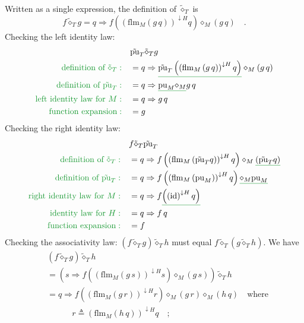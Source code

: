 Written as a single expression, the definition of $\tilde{\diamond}_{T}$
is
\begin{equation}
f\tilde{\diamond}_{T}g=q\Rightarrow f\left(\left(\text{flm}_{M}\left(g\,q\right)\right)^{\downarrow H}q\right)\diamond_{M}\left(g\,q\right)\quad.\label{eq:def-flipped-kleisli}
\end{equation}
Checking the left identity law:
\begin{align*}
 & \tilde{\text{pu}}_{T}\tilde{\diamond}_{T}g\\
{\color{greenunder}\text{definition of }\tilde{\diamond}_{T}:}\quad & =q\Rightarrow\gunderline{\tilde{\text{pu}}_{T}\left(\left(\text{flm}_{M}\left(g\,q\right)\right)^{\downarrow H}q\right)}\diamond_{M}\left(g\,q\right)\\
{\color{greenunder}\text{definition of }\tilde{\text{pu}}_{T}:}\quad & =q\Rightarrow\gunderline{\text{pu}_{M}\diamond_{M}}g\,q\\
{\color{greenunder}\text{left identity law for }M:}\quad & =q\Rightarrow g\,q\\
{\color{greenunder}\text{function expansion}:}\quad & =g
\end{align*}
Checking the right identity law:
\begin{align*}
 & f\tilde{\diamond}_{T}\tilde{\text{pu}}_{T}\\
{\color{greenunder}\text{definition of }\tilde{\diamond}_{T}:}\quad & =q\Rightarrow f\left(\left(\text{flm}_{M}\left(\tilde{\text{pu}}_{T}q\right)\right)^{\downarrow H}q\right)\diamond_{M}\gunderline{\left(\tilde{\text{pu}}_{T}q\right)}\\
{\color{greenunder}\text{definition of }\tilde{\text{pu}}_{T}:}\quad & =q\Rightarrow f\left(\left(\text{flm}_{M}\left(\text{pu}_{M}\right)\right)^{\downarrow H}q\right)\gunderline{\diamond_{M}\text{pu}_{M}}\\
{\color{greenunder}\text{right identity law for }M:}\quad & =q\Rightarrow f\gunderline{\left(\left(\text{id}\right)^{\downarrow H}q\right)}\\
{\color{greenunder}\text{identity law for }H:}\quad & =q\Rightarrow f\,q\\
{\color{greenunder}\text{function expansion}:}\quad & =f
\end{align*}
Checking the associativity law: $\left(f\tilde{\diamond}_{T}g\right)\tilde{\diamond}_{T}h$
must equal $f\tilde{\diamond}_{T}\left(g\tilde{\diamond}_{T}h\right)$.
We have
\begin{align*}
 & \left(f\tilde{\diamond}_{T}g\right)\tilde{\diamond}_{T}h\\
 & =\left(s\Rightarrow f\left(\left(\text{flm}_{M}\left(g\,s\right)\right)^{\downarrow H}s\right)\diamond_{M}\left(g\,s\right)\right)\tilde{\diamond}_{T}h\\
 & =q\Rightarrow f\left(\left(\text{flm}_{M}\left(g\,r\right)\right)^{\downarrow H}r\right)\diamond_{M}\left(g\,r\right)\diamond_{M}\left(h\,q\right)\quad\text{where}\\
 & \quad\quad\quad r\triangleq\left(\text{flm}_{M}\left(h\,q\right)\right)^{\downarrow H}q\quad;
\end{align*}
